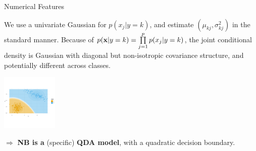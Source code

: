 \documentclass[11pt,compress,t,notes=noshow, xcolor=table]{beamer}
\begin{document}
\begin{vbframe}{Numerical Features}

We use a univariate Gaussian for $p(x_j | y=k)$, and estimate $(\mu_{kj}, \sigma^2_{kj})$ in the standard manner. Because of $p(\mathbf{x} | y= k) = \prod\limits_{j=1}^p p(x_j|y = k)$, the joint conditional density is Gaussian with diagonal but non-isotropic covariance structure, and potentially different across classes.

\begin{center}
\includegraphics[width=0.2\textwidth]{figure/nb-db.png} 
\end{center}

$\Rightarrow$  \textbf{NB is a} (specific) \textbf{QDA model}, with a quadratic decision boundary.

\end{vbframe}
\end{document}
